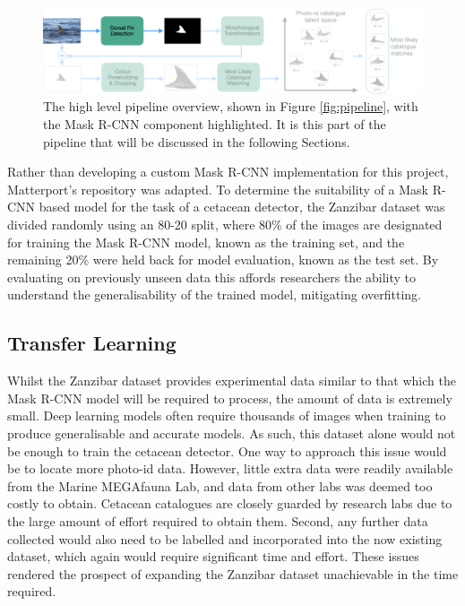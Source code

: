 \begin{figure}[!h]
	\begin{center}
		\includegraphics[width=\linewidth]{Chapter4/figs/pipeline-detector.png}
	\end{center}
	\caption[The high level pipeline overview, shown in Figure \ref{fig:pipeline}, with the Mask R-CNN component highlighted.]{The high level pipeline overview, shown in Figure \ref{fig:pipeline}, with the Mask R-CNN component highlighted. It is this part of the pipeline that will be discussed in the following Sections.}
	\label{fig:pipeline-detector}
\end{figure}

Rather than developing a custom Mask R-CNN implementation for this project, Matterport's repository \cite{waleed_mask_2017} was adapted. To determine the suitability of a Mask R-CNN based model for the task of a cetacean detector, the Zanzibar dataset was divided randomly using an 80-20 split, where 80\% of the images are designated for training the Mask R-CNN model, known as the training set, and the remaining 20\% were held back for model evaluation, known as the test set. By evaluating on previously unseen data this affords researchers the ability to understand the generalisability of the trained model, mitigating overfitting.

\subsection{Transfer Learning}\label{ch:cetDet,sec:initialTesting,sub:transferLearning}

Whilst the Zanzibar dataset provides experimental data similar to that which the Mask R-CNN model will be required to process, the amount of data is extremely small. Deep learning models often require thousands of images when training to produce generalisable and accurate models. As such, this dataset alone would not be enough to train the cetacean detector. One way to approach this issue would be to locate more photo-id data. However, little extra data were readily available from the Marine MEGAfauna Lab, and data from other labs was deemed too costly to obtain. Cetacean catalogues are closely guarded by research labs due to the large amount of effort required to obtain them. Second, any further data collected would also need to be labelled and incorporated into the now existing dataset, which again would require significant time and effort. These issues rendered the prospect of expanding the Zanzibar dataset unachievable in the time required. 

